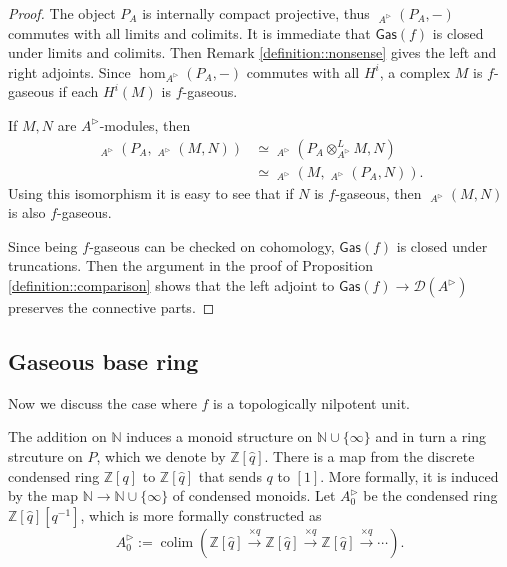 \documentclass{article}
\theoremstyle{plain}
\theoremstyle{definition}
\theoremstyle{remark}
\DeclareMathOperator{\colim}{colim}
\DeclareMathOperator{\rhoms}{\underline{RHom}}
\newcommand{\dten}{\otimes ^{L}}
\newcommand{\huflag}{\triangleright}
\newcommand{\D}{\mathcal{D}}
\begin{document}
\begin{proof}
The object $ P _{A} $ is internally compact projective, thus $ \rhoms _{A ^{\huflag}}(P _{A}, -) $ commutes with all limits and colimits.
It is immediate that $ \mathsf{Gas}(f) $ is closed under limits and colimits.
Then Remark \ref{definition::nonsense} gives the left and right adjoints.
Since $ \hom _{A ^{\huflag}}(P _{A}, -) $ commutes with all $ H ^{i} $, a complex $ M $ is $ f $-gaseous if each $ H ^{i}(M) $ is $ f $-gaseous.

If $ M,N $ are $ A ^{\huflag} $-modules, then
\begin{align*}
\rhoms _{A ^{\huflag}}(P _{A}, \rhoms _{A ^{\huflag}}(M, N))
&\simeq \rhoms _{A ^{\huflag}}(P _{A}\dten _{A ^{\huflag}} M, N)\\
&\simeq \rhoms _{A ^{\huflag}}(M, \rhoms _{A ^{\huflag}}(P _{A}, N)).
\end{align*}
Using this isomorphism it is easy to see that if $ N $ is $ f $-gaseous,
then $ \rhoms _{A ^{\huflag}}(M, N) $ is also $ f $-gaseous.

Since being $ f $-gaseous can be checked on cohomology, $ \mathsf{Gas}(f) $ is closed under truncations.
Then the argument in the proof of Proposition \ref{definition::comparison} shows that
the left adjoint to $ \mathsf{Gas}(f)\to \D (A ^{\huflag}) $ preserves the connective parts.
\end{proof}

\subsection{Gaseous base ring}

Now we discuss the case where $ f $ is a topologically nilpotent unit.

The addition on $ \mathbb{N} $ induces a monoid structure on $ \mathbb{N}\cup \{\infty\} $
and in turn a ring strcuture on $ P $,
which we denote by $ \mathbb{Z}[\hat{q}] $.
There is a map from the discrete condensed ring $ \mathbb{Z}[q] $ to $ \mathbb{Z}[\hat{q}] $
that sends $ q $ to $ [1] $.
More formally, it is induced by the map $ \mathbb{N}\to \mathbb{N}\cup \{\infty\} $ of condensed monoids.
Let $ A _{0}^{\huflag} $ be the condensed ring $ \mathbb{Z}[\hat{q}][q ^{-1}]$,
which is more formally constructed as
\begin{equation*}
A _{0}^{\huflag} := \colim (\mathbb{Z}[\hat{q}] \xrightarrow{\times q} \mathbb{Z}[\hat{q}]\xrightarrow{\times q} \mathbb{Z}[\hat{q}]\xrightarrow{\times q} \cdots   ).
\end{equation*}
\end{document}

